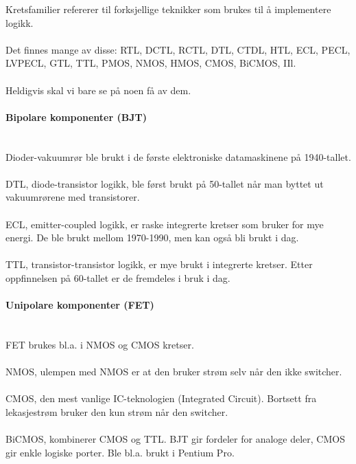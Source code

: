 Kretsfamilier refererer til forksjellige teknikker som brukes til å
implementere logikk.
\\\\
Det finnes mange av disse: RTL, DCTL, RCTL, DTL, CTDL, HTL, ECL, PECL, LVPECL,
GTL, TTL, PMOS, NMOS, HMOS, CMOS, BiCMOS, IIl.
\\\\
Heldigvis skal vi bare se på noen få av dem.



\paragraph{Bipolare komponenter (BJT)} \mbox{} \\
Dioder-vakuumrør ble brukt i de første elektroniske datamaskinene
på 1940-tallet.
\\\\
DTL, diode-transistor logikk, ble først brukt på 50-tallet når man byttet ut
vakuumrørene med transistorer.
\\\\
ECL, emitter-coupled logikk, er raske integrerte kretser som bruker for mye
energi. De ble brukt mellom 1970-1990, men kan også bli brukt i dag.
\\\\
TTL, transistor-transistor logikk, er mye brukt i integrerte kretser.
Etter oppfinnelsen på 60-tallet er de fremdeles i bruk i dag.



\paragraph{Unipolare komponenter (FET)} \mbox{} \\
FET brukes bl.a. i NMOS og CMOS kretser.
\\\\
NMOS, ulempen med NMOS er at den bruker strøm selv når den ikke switcher.
\\\\
CMOS, den mest vanlige IC-teknologien (Integrated Circuit).
Bortsett fra lekasjestrøm bruker den kun strøm når den switcher.
\\\\
BiCMOS, kombinerer CMOS og TTL.
BJT gir fordeler for analoge deler, CMOS gir enkle logiske porter.
Ble bl.a. brukt i Pentium Pro.
